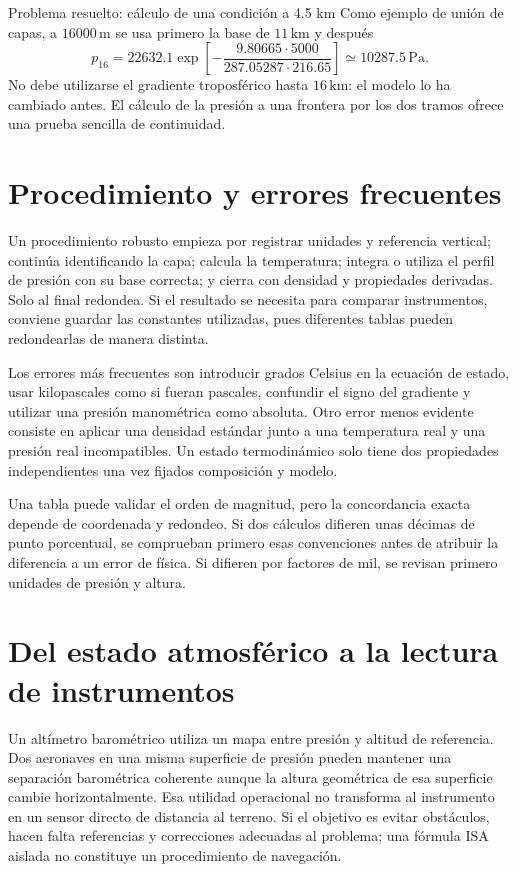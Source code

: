 \begin{studiumworked}{Problema resuelto: cálculo de una condición a 4.5 km}
Como ejemplo de unión de capas, a $16000\,\mathrm{m}$ se usa primero la base de $11\,\mathrm{km}$ y después
\begin{equation}
 p_{16}=22632.1\exp\left[-\frac{9.80665\cdot5000}{287.05287\cdot216.65}\right]
 \simeq10287.5\,\mathrm{Pa}.
\end{equation}
No debe utilizarse el gradiente troposférico hasta $16\,\mathrm{km}$: el modelo lo ha cambiado antes. El cálculo de la presión a una frontera por los dos tramos ofrece una prueba sencilla de continuidad.


\end{studiumworked}

\section{Procedimiento y errores frecuentes}
Un procedimiento robusto empieza por registrar unidades y referencia vertical; continúa identificando la capa; calcula la temperatura; integra o utiliza el perfil de presión con su base correcta; y cierra con densidad y propiedades derivadas. Solo al final redondea. Si el resultado se necesita para comparar instrumentos, conviene guardar las constantes utilizadas, pues diferentes tablas pueden redondearlas de manera distinta.

Los errores más frecuentes son introducir grados Celsius en la ecuación de estado, usar kilopascales como si fueran pascales, confundir el signo del gradiente y utilizar una presión manométrica como absoluta. Otro error menos evidente consiste en aplicar una densidad estándar junto a una temperatura real y una presión real incompatibles. Un estado termodinámico solo tiene dos propiedades independientes una vez fijados composición y modelo.

Una tabla puede validar el orden de magnitud, pero la concordancia exacta depende de coordenada y redondeo. Si dos cálculos difieren unas décimas de punto porcentual, se comprueban primero esas convenciones antes de atribuir la diferencia a un error de física. Si difieren por factores de mil, se revisan primero unidades de presión y altura.

\section{Del estado atmosférico a la lectura de instrumentos}
Un altímetro barométrico utiliza un mapa entre presión y altitud de referencia. Dos aeronaves en una misma superficie de presión pueden mantener una separación barométrica coherente aunque la altura geométrica de esa superficie cambie horizontalmente. Esa utilidad operacional no transforma al instrumento en un sensor directo de distancia al terreno. Si el objetivo es evitar obstáculos, hacen falta referencias y correcciones adecuadas al problema; una fórmula ISA aislada no constituye un procedimiento de navegación.

